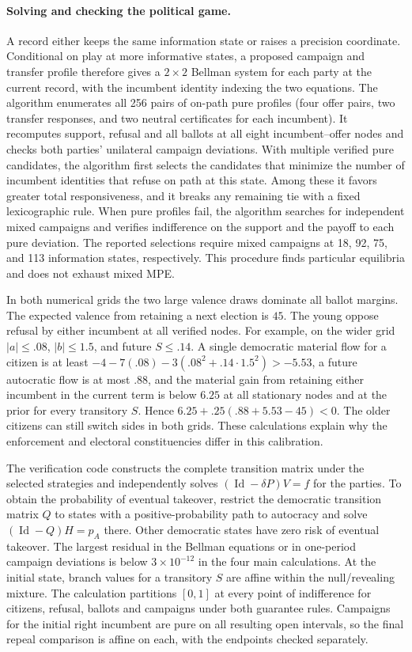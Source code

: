 \documentclass[11pt,letterpaper]{article}
\newcommand{\Id}{\operatorname{Id}}
\begin{document}
\paragraph{Solving and checking the political game.}
A record either keeps the same information state or raises a precision coordinate. Conditional on play at more informative states, a proposed campaign and transfer profile therefore gives a $2\times2$ Bellman system for each party at the current record, with the incumbent identity indexing the two equations. The algorithm enumerates all 256 pairs of on-path pure profiles (four offer pairs, two transfer responses, and two neutral certificates for each incumbent). It recomputes support, refusal and all ballots at all eight incumbent--offer nodes and checks both parties' unilateral campaign deviations. With multiple verified pure candidates, the algorithm first selects the candidates that minimize the number of incumbent identities that refuse on path at this state. Among these it favors greater total responsiveness, and it breaks any remaining tie with a fixed lexicographic rule. When pure profiles fail, the algorithm searches for independent mixed campaigns and verifies indifference on the support and the payoff to each pure deviation. The reported selections require mixed campaigns at 18, 92, 75, and 113 information states, respectively. This procedure finds particular equilibria and does not exhaust mixed MPE.

In both numerical grids the two large valence draws dominate all ballot margins. The expected valence from retaining a next election is $45$. The young oppose refusal by either incumbent at all verified nodes. For example, on the wider grid $|a|\le .08$, $|b|\le1.5$, and future $S\le.14$. A single democratic material flow for a citizen is at least $-4-7(.08)-3(.08^2+.14\cdot1.5^2)>-5.53$, a future autocratic flow is at most $.88$, and the material gain from retaining either incumbent in the current term is below $6.25$ at all stationary nodes and at the prior for every transitory $S$. Hence $6.25+.25(.88+5.53-45)<0$. The older citizens can still switch sides in both grids. These calculations explain why the enforcement and electoral constituencies differ in this calibration.

The verification code constructs the complete transition matrix under the selected strategies and independently solves $(\Id-\delta P)V=f$ for the parties. To obtain the probability of eventual takeover, restrict the democratic transition matrix $Q$ to states with a positive-probability path to autocracy and solve $(\Id-Q)H=p_A$ there. Other democratic states have zero risk of eventual takeover. The largest residual in the Bellman equations or in one-period campaign deviations is below $3\times10^{-12}$ in the four main calculations. At the initial state, branch values for a transitory $S$ are affine within the null/revealing mixture. The calculation partitions $[0,1]$ at every point of indifference for citizens, refusal, ballots and campaigns under both guarantee rules. Campaigns for the initial right incumbent are pure on all resulting open intervals, so the final repeal comparison is affine on each, with the endpoints checked separately.
\end{document}
